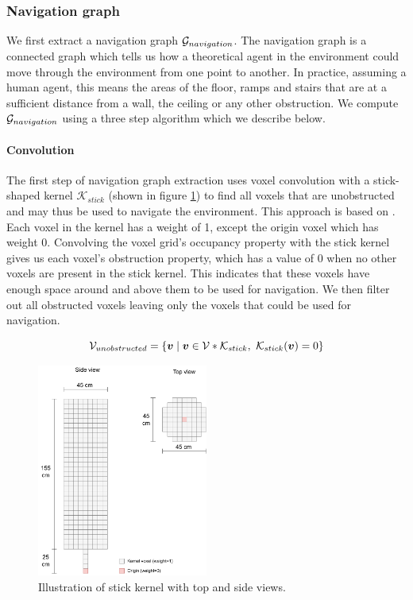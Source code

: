 \subsubsection{Navigation graph}
We first extract a navigation graph \(\mathcal{G}_{navigation}\). The navigation graph is a connected graph which tells us how a theoretical agent in the environment could move through the environment from one point to another. In practice, assuming a human agent, this means the areas of the floor, ramps and stairs that are at a sufficient distance from a wall, the ceiling or any other obstruction. We compute \(\mathcal{G}_{navigation}\) using a three step algorithm which we describe below.

\paragraph{Convolution}
The first step of navigation graph extraction uses voxel convolution with a stick-shaped kernel \(\mathcal{K}_{stick}\) (shown in figure \ref{fig:stick_kernel}) to find all voxels that are unobstructed and may thus be used to navigate the environment. This approach is based on \citet{gorte_navigation_2019}. Each voxel in the kernel has a weight of 1, except the origin voxel which has weight 0. Convolving the voxel grid's occupancy property with the stick kernel gives us each voxel's obstruction property, which has a value of 0 when no other voxels are present in the stick kernel. This indicates that these voxels have enough space around and above them to be used for navigation. We then filter out all obstructed voxels leaving only the voxels that could be used for navigation.

\begin{equation}
    \label{eq:convolve}
\mathcal{V}_{unobstructed}=\{\boldsymbol{v} \mid \boldsymbol{v} \in \mathcal{V} * \mathcal{K}_{stick},\ \mathcal{K}_{stick}(\boldsymbol{v}) = 0\}
\end{equation}

\begin{figure}[h]
    \centering
    \includegraphics*[width=0.5\textwidth]{./fig/structuring_element.drawio.pdf}
    \caption{Illustration of stick kernel with top and side views.}
    \label{fig:stick_kernel}
\end{figure}

